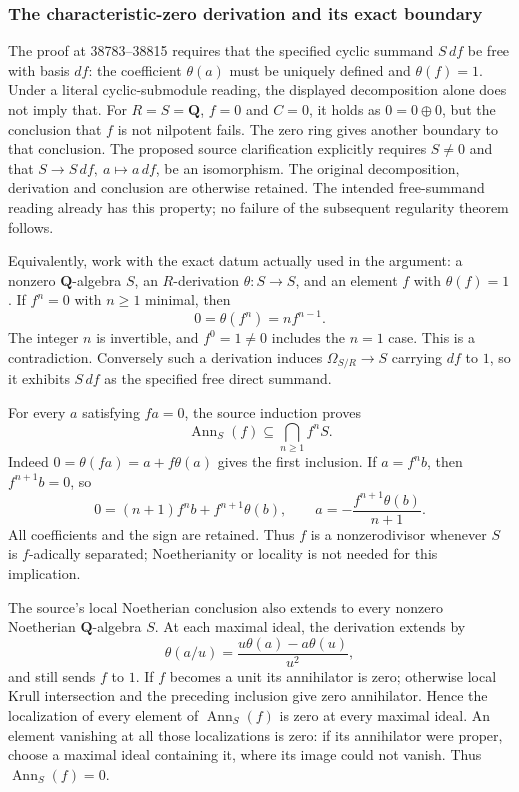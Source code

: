 \subsubsection{The characteristic-zero derivation and its exact boundary}\label{algebra-proof-049-the-characteristic-zero-derivation-and-its-exact-boundary}

The proof at 38783--38815 requires that the specified cyclic summand \(S\,df\) be free with basis \(df\): the coefficient \(\theta(a)\) must be uniquely defined and \(\theta(f)=1\). Under a literal cyclic-submodule reading, the displayed decomposition alone does not imply that. For \(R=S=\mathbf Q\), \(f=0\) and \(C=0\), it holds as \(0=0\oplus0\), but the conclusion that \(f\) is not nilpotent fails. The zero ring gives another boundary to that conclusion. The proposed source clarification explicitly requires \(S\ne0\) and that \(S\to S\,df,\ a\mapsto a\,df\), be an isomorphism. The original decomposition, derivation and conclusion are otherwise retained. The intended free-summand reading already has this property; no failure of the subsequent regularity theorem follows.

Equivalently, work with the exact datum actually used in the argument: a nonzero \(\mathbf Q\)-algebra \(S\), an \(R\)-derivation \(\theta:S\to S\), and an element \(f\) with \(\theta(f)=1\). If \(f^n=0\) with \(n\ge1\) minimal, then \[
0=\theta(f^n)=n f^{n-1}.
\] The integer \(n\) is invertible, and \(f^0=1\ne0\) includes the \(n=1\) case. This is a contradiction. Conversely such a derivation induces \(\Omega_{S/R}\to S\) carrying \(df\) to \(1\), so it exhibits \(S\,df\) as the specified free direct summand.

For every \(a\) satisfying \(fa=0\), the source induction proves \[
\operatorname{Ann}_S(f)\subseteq\bigcap_{n\ge1}f^nS.
\] Indeed \(0=\theta(fa)=a+f\theta(a)\) gives the first inclusion. If \(a=f^n b\), then \(f^{n+1}b=0\), so \[
0=(n+1)f^n b+f^{n+1}\theta(b),\qquad
a=-\frac{f^{n+1}\theta(b)}{n+1}.
\] All coefficients and the sign are retained. Thus \(f\) is a nonzerodivisor whenever \(S\) is \(f\)-adically separated; Noetherianity or locality is not needed for this implication.

The source's local Noetherian conclusion also extends to every nonzero Noetherian \(\mathbf Q\)-algebra \(S\). At each maximal ideal, the derivation extends by \[
\theta(a/u)=\frac{u\theta(a)-a\theta(u)}{u^2},
\] and still sends \(f\) to \(1\). If \(f\) becomes a unit its annihilator is zero; otherwise local Krull intersection and the preceding inclusion give zero annihilator. Hence the localization of every element of \(\operatorname{Ann}_S(f)\) is zero at every maximal ideal. An element vanishing at all those localizations is zero: if its annihilator were proper, choose a maximal ideal containing it, where its image could not vanish. Thus \(\operatorname{Ann}_S(f)=0\).

